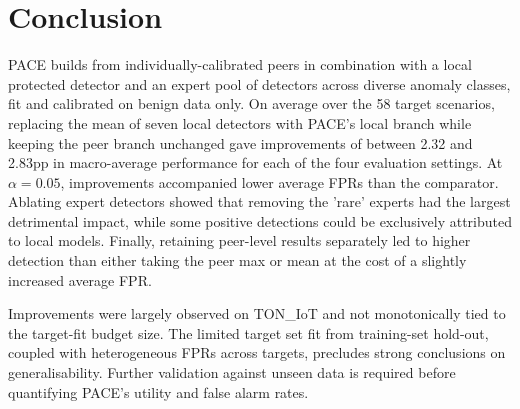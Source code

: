 \section{Conclusion} 
PACE builds from individually-calibrated peers in combination with a local protected detector and an expert pool of detectors across diverse anomaly classes, fit and calibrated on benign data only. On average over the 58 target scenarios, replacing the mean of seven local detectors with PACE's local branch while keeping the peer branch unchanged gave improvements of between 2.32 and 2.83pp in macro-average performance for each of the four evaluation settings. At $\alpha=0.05$, improvements accompanied lower average FPRs than the comparator. Ablating expert detectors showed that removing the 'rare' experts had the largest detrimental impact, while some positive detections could be exclusively attributed to local models. Finally, retaining peer-level results separately led to higher detection than either taking the peer max or mean at the cost of a slightly increased average FPR.

Improvements were largely observed on TON\_IoT and not monotonically tied to the target-fit budget size. The limited target set fit from training-set hold-out, coupled with heterogeneous FPRs across targets, precludes strong conclusions on generalisability. Further validation against unseen data is required before quantifying PACE's utility and false alarm rates.
